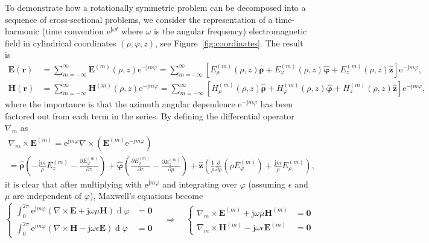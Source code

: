 \documentclass[a4paper,12pt]{article}
\renewcommand{\vec}[1]{\boldsymbol{#1}}
\newcommand{\unitvec}[1]{\hat{\vec{#1}}}
\newcommand{\mrm}[1]{\mathrm{#1}}
\newcommand{\diff}{\operatorname{d}\!}
\newcommand{\ju}{\mrm{j}}
\newcommand{\eu}{\mrm{e}}
\newcommand{\Ev}{\vec{E}}
\newcommand{\Hv}{\vec{H}}
\newcommand{\rv}{\vec{r}}
\newcommand{\Zv}{\vec{0}}
\newcommand{\zuv}{\unitvec{z}}
\newcommand{\rhouv}{\unitvec{\rho}}
\newcommand{\varphiuv}{\unitvec{\varphi}}
\begin{document}
To demonstrate how a rotationally symmetric problem can be decomposed
into a sequence of cross-sectional problems, we consider the
representation of a time-harmonic (time convention $\eu^{\ju\omega t}$
where $\omega$ is the angular frequency) electromagnetic field in
cylindrical coordinates $(\rho,\varphi,z)$, see
Figure~\ref{fig:coordinates}. The result is
\begin{align}
  \Ev(\rv) &= \sum_{m=-\infty}^{\infty}\Ev^{(m)}(\rho,z)\eu^{-\ju m\varphi} = \sum_{m=-\infty}^{\infty} \left[E_{\rho}^{(m)}(\rho,z)\rhouv + E_{\varphi}^{(m)}(\rho,z)\varphiuv + E_{z}^{(m)}(\rho,z)\zuv \right] \eu^{-\ju m\varphi}, \\
  \Hv(\rv) &= \sum_{m=-\infty}^{\infty}\Hv^{(m)}(\rho,z)\eu^{-\ju m\varphi} = \sum_{m=-\infty}^{\infty} \left[H_{\rho}^{(m)}(\rho,z)\rhouv + H_{\varphi}^{(m)}(\rho,z)\varphiuv + H_{z}^{(m)}(\rho,z)\zuv \right] \eu^{-\ju m\varphi},
\end{align}
where the importance is that the azimuth angular dependence
$\eu^{-\ju m\varphi}$ has been factored out from each term in the
series. By defining the differential operator $\nabla_{m}$ as
\begin{multline}
  \nabla_{m}\times\Ev^{(m)} = \eu^{\ju m\varphi}\nabla\times(\Ev^{(m)}\eu^{-\ju m\varphi}) \\
  = \rhouv\left(-\frac{\ju m}{\rho}E_{z}^{(m)} - \frac{\partial E_{\varphi}^{(m)}}{\partial z}\right) + \varphiuv\left(\frac{\partial E_{\rho}^{(m)}}{\partial z} - \frac{\partial E_{z}^{(m)}}{\partial\rho}\right) + \zuv\left( \frac{1}{\rho}\frac{\partial}{\partial\rho}(\rho E_{\varphi}^{(m)}) + \frac{\ju m}{\rho}E_{\rho}^{(m)}\right),
\end{multline}
it is clear that after multiplying with $\eu^{\ju m\varphi}$ and
integrating over $\varphi$ (assuming $\epsilon$ and $\mu$ are
independent of $\varphi$), Maxwell's equations become
\begin{equation}
  \left\{
    \begin{aligned}
      \int_{0}^{2\pi}\eu^{\ju m\varphi}(\nabla\times\Ev + \ju\omega\mu\Hv)\diff\varphi &= \Zv \\
      \int_{0}^{2\pi}\eu^{\ju m\varphi}(\nabla\times\Hv - \ju\omega\epsilon\Ev)\diff\varphi &= \Zv
    \end{aligned}\right. \quad\Rightarrow\quad
  \left\{
    \begin{aligned}
      \nabla_{m}\times\Ev^{(m)} + \ju\omega\mu\Hv^{(m)} &= \Zv \\
      \nabla_{m}\times\Hv^{(m)} - \ju\omega\epsilon\Ev^{(m)} &= \Zv
    \end{aligned}\right.
\end{equation}
\end{document}
